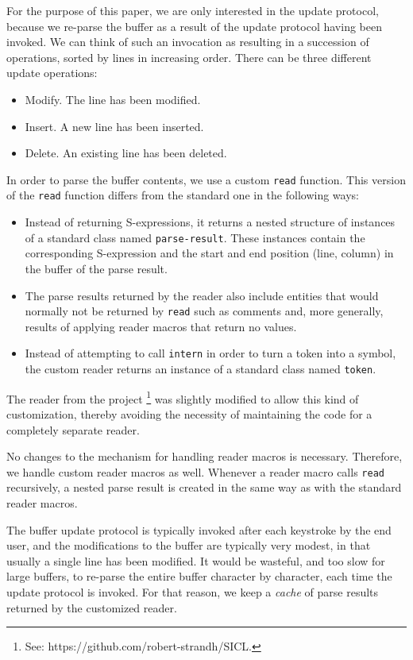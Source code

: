 For the purpose of this paper, we are only interested in the update
protocol, because we re-parse the buffer as a result of the update
protocol having been invoked.  We can think of such an invocation as
resulting in a succession of operations, sorted by lines in increasing
order.  There can be three different update operations:

\begin{itemize}
\item Modify.  The line has been modified.
\item Insert.  A new line has been inserted.
\item Delete.  An existing line has been deleted.
\end{itemize}

In order to parse the buffer contents, we use a custom \texttt{read}
function.  This version of the \texttt{read} function differs from the
standard one in the following ways:

\begin{itemize}
\item Instead of returning S-expressions, it returns a nested
  structure of instances of a standard class named
  \texttt{parse-result}.  These instances contain the corresponding
  S-expression and the start and end position (line, column) in the
  buffer of the parse result.
\item The parse results returned by the reader also include entities
  that would normally not be returned by \texttt{read} such as
  comments and, more generally, results of applying reader macros
  that return no values.
\item Instead of attempting to call \texttt{intern} in order to turn a
  token into a symbol, the custom reader returns an instance of a
  standard class named \texttt{token}.
\end{itemize}

The reader from the \sicl{} project%
\footnote{See: https://github.com/robert-strandh/SICL.}  was slightly
modified to allow this kind of customization, thereby avoiding the
necessity of maintaining the code for a completely separate reader.

No changes to the mechanism for handling reader macros is necessary.
Therefore, we handle custom reader macros as well.  Whenever a reader
macro calls \texttt{read} recursively, a nested parse result is
created in the same way as with the standard reader macros.

The buffer update protocol is typically invoked after each keystroke
by the end user, and the modifications to the buffer are typically
very modest, in that usually a single line has been modified.  It
would be wasteful, and too slow for large buffers, to re-parse the
entire buffer character by character, each time the update protocol is
invoked.  For that reason, we keep a \emph{cache} of parse results
returned by the customized reader.

